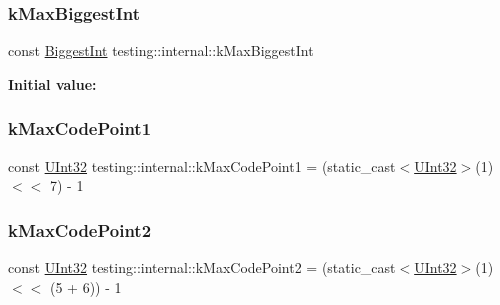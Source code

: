 \mbox{\label{namespacetesting_1_1internal_ad901880198832bc166d2493096b451f7}} 
\subsubsection{\texorpdfstring{kMaxBiggestInt}{kMaxBiggestInt}}
{\footnotesize\ttfamily const \mbox{\hyperlink{namespacetesting_1_1internal_a05c6bd9ede5ccdf25191a590d610dcc6}{Biggest\+Int}} testing\+::internal\+::k\+Max\+Biggest\+Int}

{\bfseries Initial value\+:}
\begin{DoxyCode}{0}
\DoxyCodeLine{=}

\end{DoxyCode}
\mbox{\label{namespacetesting_1_1internal_a128515c8ed6c0fe98e498c8042da2060}} 
\subsubsection{\texorpdfstring{kMaxCodePoint1}{kMaxCodePoint1}}
{\footnotesize\ttfamily const \mbox{\hyperlink{namespacetesting_1_1internal_a436defbb8e92c8e94e33ebcc86f278ba}{U\+Int32}} testing\+::internal\+::k\+Max\+Code\+Point1 = (static\+\_\+cast$<$\mbox{\hyperlink{namespacetesting_1_1internal_a436defbb8e92c8e94e33ebcc86f278ba}{U\+Int32}}$>$(1) $<$$<$ 7) -\/ 1}

\mbox{\label{namespacetesting_1_1internal_ab8f4a5ed784352f00342cfeadc72337e}} 
\subsubsection{\texorpdfstring{kMaxCodePoint2}{kMaxCodePoint2}}
{\footnotesize\ttfamily const \mbox{\hyperlink{namespacetesting_1_1internal_a436defbb8e92c8e94e33ebcc86f278ba}{U\+Int32}} testing\+::internal\+::k\+Max\+Code\+Point2 = (static\+\_\+cast$<$\mbox{\hyperlink{namespacetesting_1_1internal_a436defbb8e92c8e94e33ebcc86f278ba}{U\+Int32}}$>$(1) $<$$<$ (5 + 6)) -\/ 1}

